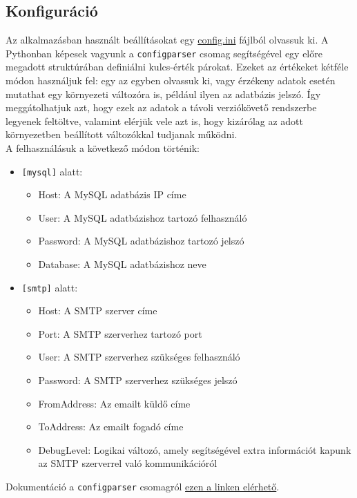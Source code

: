 \documentclass[11pt, a4paper]{article}
\begin{document}
		\subsection{Konfiguráció}
			\begin{flushleft}
				\justifying
				Az alkalmazásban használt beállításokat egy
				\color{blue} \href{https://github.com/mark182182/GKLB_INTM020_mikroelektromechanikai_rendszerek/blob/main/config.ini}{config.ini}
				\color{black}
				fájlból olvassuk ki. A Pythonban képesek vagyunk a \texttt{configparser} csomag segítségével egy előre megadott struktúrában definiálni kulcs-érték párokat. Ezeket az értékeket kétféle módon használjuk fel: egy az egyben olvassuk ki, vagy érzékeny adatok esetén mutathat egy környezeti változóra is, például ilyen az adatbázis jelszó. Így meggátolhatjuk azt, hogy ezek az adatok a távoli verziókövető rendszerbe legyenek feltöltve, valamint elérjük vele azt is, hogy kizárólag az adott környezetben beállított változókkal tudjanak működni.\\
				A felhasználásuk a következő módon történik:
				\begin{itemize}
					\item \texttt{[mysql]} alatt:
					\begin{itemize}
						\item Host: A MySQL adatbázis IP címe
						\item User: A MySQL adatbázishoz tartozó felhasználó
						\item Password: A MySQL adatbázishoz tartozó jelszó
						\item Database: A MySQL adatbázishoz neve
					\end{itemize}
					\item \texttt{[smtp]} alatt:
						\begin{itemize}
							\item Host: A SMTP szerver címe
							\item Port: A SMTP szerverhez tartozó port
							\item User: A SMTP szerverhez szükséges felhasználó
							\item Password: A SMTP szerverhez szükséges jelszó
							\item FromAddress: Az emailt küldő címe
							\item ToAddress: Az emailt fogadó címe
							\item DebugLevel: Logikai változó, amely segítségével extra információt kapunk az SMTP szerverrel való kommunikációról
						\end{itemize}
				\end{itemize}
				Dokumentáció a \texttt{configparser} csomagról
				\color{blue}
				\href{https://docs.python.org/3/library/configparser.html}{ezen a linken elérhető}\color{black}.
			\end{flushleft}
			
\end{document}

